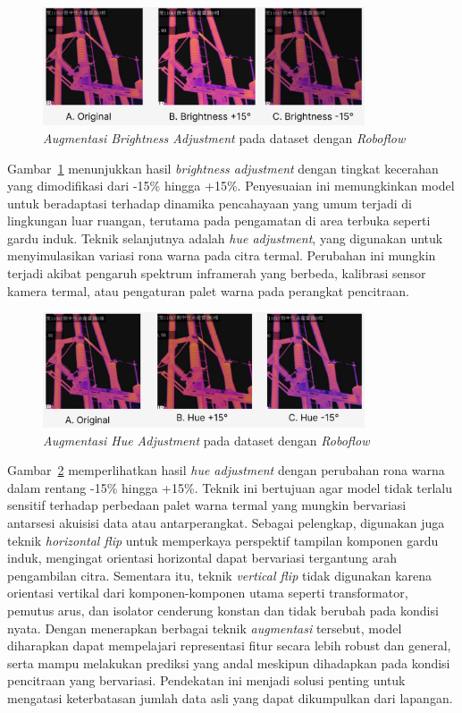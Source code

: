 \begin{figure}[H]
  \centering
  \includegraphics[width=0.85\textwidth]{gambar/bab3/aug-brig.png}
  \caption{\emph{Augmentasi Brightness Adjustment} pada dataset dengan \emph{Roboflow}}
  \label{fig:dataset-brightness}
\end{figure}

Gambar~\ref{fig:dataset-brightness} menunjukkan hasil \emph{brightness adjustment} dengan tingkat kecerahan yang dimodifikasi dari -15\% hingga +15\%. Penyesuaian ini memungkinkan model untuk beradaptasi terhadap dinamika pencahayaan yang umum terjadi di lingkungan luar ruangan, terutama pada pengamatan di area terbuka seperti gardu induk. Teknik selanjutnya adalah \emph{hue adjustment}, yang digunakan untuk menyimulasikan variasi rona warna pada citra termal. Perubahan ini mungkin terjadi akibat pengaruh spektrum inframerah yang berbeda, kalibrasi sensor kamera termal, atau pengaturan palet warna pada perangkat pencitraan.

\begin{figure}[H]
  \centering
  \includegraphics[width=0.85\textwidth]{gambar/bab3/aug-hue.png}
  \caption{\emph{Augmentasi Hue Adjustment} pada dataset dengan \emph{Roboflow}}
  \label{fig:dataset-hue}
\end{figure}

Gambar~\ref{fig:dataset-hue} memperlihatkan hasil \emph{hue adjustment} dengan perubahan rona warna dalam rentang -15\% hingga +15\%. Teknik ini bertujuan agar model tidak terlalu sensitif terhadap perbedaan palet warna termal yang mungkin bervariasi antarsesi akuisisi data atau antarperangkat. Sebagai pelengkap, digunakan juga teknik \emph{horizontal flip} untuk memperkaya perspektif tampilan komponen gardu induk, mengingat orientasi horizontal dapat bervariasi tergantung arah pengambilan citra. Sementara itu, teknik \emph{vertical flip} tidak digunakan karena orientasi vertikal dari komponen-komponen utama seperti transformator, pemutus arus, dan isolator cenderung konstan dan tidak berubah pada kondisi nyata. Dengan menerapkan berbagai teknik \emph{augmentasi} tersebut, model diharapkan dapat mempelajari representasi fitur secara lebih robust dan general, serta mampu melakukan prediksi yang andal meskipun dihadapkan pada kondisi pencitraan yang bervariasi. Pendekatan ini menjadi solusi penting untuk mengatasi keterbatasan jumlah data asli yang dapat dikumpulkan dari lapangan.


